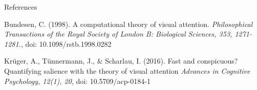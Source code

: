\documentclass[a0paper,portrait]{baposter}
\begin{document}
\begin{poster}
		\begin{posterbox}[name=refs,column=0,span=3,below=procedure,above=bottom]{References}
			\footnotesize
			\linespread{1}
			
			{\color{upbblue}Bundesen, C. } ({\color{upbblue}1998}). A computational theory of visual attention. \textit{Philosophical Transactions of the Royal Society of London B: Biological Sciences, 353, 1271-1281.}, doi: 10.1098/rstb.1998.0282 
			
			{\color{upbblue}Krüger, A., Tünnermann, J., \& Scharlau, I.} ({\color{upbblue}2016}). Fast and conspicuous? Quantifying salience with the theory of visual attention \textit{Advances in Cognitive Psychology, 12(1), 20}, doi: 10.5709/acp-0184-1 
			\vspace{0.115cm}
		\end{posterbox}
		
	\end{poster}
\end{document}
